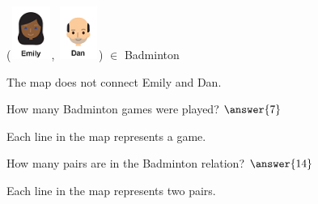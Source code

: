 \documentclass{ximera}
\begin{document}
\begin{exercise}
 ({\includegraphics[width=50px,height=65px]{pics/people/emily.png}}, {\includegraphics[width=50px,height=65px]{pics/people/dan.png}}) $\in$ Badminton 

  \begin{multipleChoice}
  \end{multipleChoice}
  \begin{feedback}
The map does not connect Emily and Dan.
  \end{feedback}
\end{exercise}












\begin{exercise}
How many Badminton games were played? $\answer{7}$
  \begin{feedback}
Each line in the map represents a game.
  \end{feedback}
\end{exercise}




\begin{exercise}
How many pairs are in the Badminton relation? $\answer{14}$
  \begin{feedback}
Each line in the map represents two pairs.
  \end{feedback}
\end{exercise}
\end{document}
